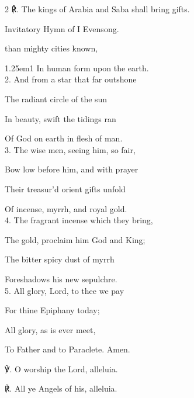 \begin{paracol}{2}
℟. The kings of Arabia and Saba shall bring gifts.


\switchcolumn

\mattins

\begin{rubric}
	 Invitatory Hymn of I Evensong.
\end{rubric}


\mattinsOfficeHymn\label{EpiphanyMattinsHymn}

 than mighty cities known,


\begin{hangparas}{1.25em}{1}
In human form upon the earth.\\

2. And from a star that far outshone

The radiant circle of the sun

In beauty, swift the tidings ran

Of God on earth in flesh of man.\\

3. The wise men, seeing him, so fair,

Bow low before him, and with prayer

Their treasur'd orient gifts unfold

Of incense, myrrh, and royal gold.\\

4. The fragrant incense which they bring,

The gold, proclaim him God and King;

The bitter spicy dust of myrrh

Foreshadows his new sepulchre.\\

5. All glory, Lord, to thee we pay

For thine Epiphany today;

All glory, as is ever meet,

To Father and to Paraclete. Amen.\\
\end{hangparas}

℣. O worship the Lord, alleluia.

℟. All ye Angels of his, alleluia.


\fussy
\end{paracol}

